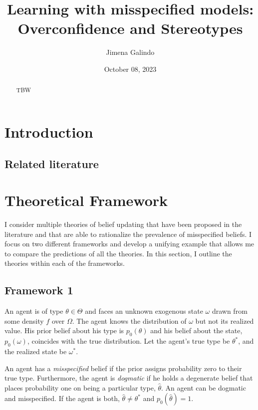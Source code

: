 \documentclass[
  12pt,
]{article}
\title{Learning with misspecified models: Overconfidence and
Stereotypes}
\author{Jimena Galindo}
\date{October 08, 2023}
\begin{document}
\maketitle
\begin{abstract}
TBW
\end{abstract}

\hypertarget{introduction}{%
\section{Introduction}\label{introduction}}

\hypertarget{related-literature}{%
\subsection{Related literature}\label{related-literature}}

\hypertarget{theoretical-framework}{%
\section{Theoretical Framework}\label{theoretical-framework}}

I consider multiple theories of belief updating that have been proposed
in the literature and that are able to rationalize the prevalence of
misspecified beliefs. I focus on two different frameworks and develop a
unifying example that allows me to compare the predictions of all the
theories. In this section, I outline the theories within each of the
frameworks.

\hypertarget{framework-1}{%
\subsection{Framework 1}\label{framework-1}}

An agent is of type \(\theta \in \Theta\) and faces an unknown exogenous
state \(\omega\) drawn from some density \(f\) over \(\Omega\). The
agent knows the distribution of \(\omega\) but not its realized value.
His prior belief about his type is \(p_0(\theta)\) and his belief about
the state, \(p_0(\omega)\), coincides with the true distribution. Let
the agent's true type be \(\theta^{*}\), and the realized state be
\(\omega^{*}\).

An agent has a \emph{misspecified} belief if the prior assigns
probability zero to their true type. Furthermore, the agent is
\emph{dogmatic} if he holds a degenerate belief that places probability
one on being a particular type, \(\hat{\theta}\). An agent can be
dogmatic and misspecified. If the agent is both,
\(\hat{\theta} \neq \theta^*\) and \(p_0(\hat{\theta}) = 1\).
\end{document}
